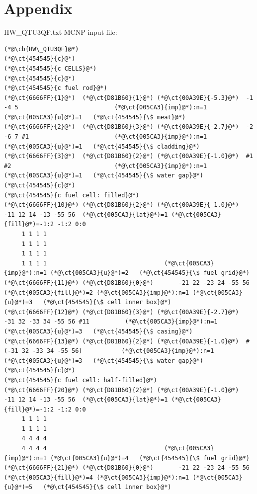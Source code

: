 \section*{Appendix}

HW\_QTU3QF.txt MCNP input file:

\begin{lstlisting}
(*@\cb{HW\_QTU3QF}@*)
(*@\ct{454545}{c}@*)
(*@\ct{454545}{c CELLS}@*)
(*@\ct{454545}{c}@*)
(*@\ct{454545}{c fuel rod}@*)
(*@\ct{6666FF}{1}@*)  (*@\ct{D81B60}{1}@*) (*@\ct{00A39E}{-5.3}@*)  -1 -4 5                           (*@\ct{005CA3}{imp}@*):n=1 (*@\ct{005CA3}{u}@*)=1   (*@\ct{454545}{\$ meat}@*)
(*@\ct{6666FF}{2}@*)  (*@\ct{D81B60}{3}@*) (*@\ct{00A39E}{-2.7}@*)  -2 -6 7 #1                        (*@\ct{005CA3}{imp}@*):n=1 (*@\ct{005CA3}{u}@*)=1   (*@\ct{454545}{\$ cladding}@*)
(*@\ct{6666FF}{3}@*)  (*@\ct{D81B60}{2}@*) (*@\ct{00A39E}{-1.0}@*)  #1 #2                             (*@\ct{005CA3}{imp}@*):n=1 (*@\ct{005CA3}{u}@*)=1   (*@\ct{454545}{\$ water gap}@*)
(*@\ct{454545}{c}@*)
(*@\ct{454545}{c fuel cell: filled}@*)
(*@\ct{6666FF}{10}@*) (*@\ct{D81B60}{2}@*) (*@\ct{00A39E}{-1.0}@*)  -11 12 14 -13 -55 56  (*@\ct{005CA3}{lat}@*)=1 (*@\ct{005CA3}{fill}@*)=-1:2 -1:2 0:0
     1 1 1 1
     1 1 1 1
     1 1 1 1
     1 1 1 1                                 (*@\ct{005CA3}{imp}@*):n=1 (*@\ct{005CA3}{u}@*)=2   (*@\ct{454545}{\$ fuel grid}@*)
(*@\ct{6666FF}{11}@*) (*@\ct{D81B60}{0}@*)       -21 22 -23 24 -55 56       (*@\ct{005CA3}{fill}@*)=2 (*@\ct{005CA3}{imp}@*):n=1 (*@\ct{005CA3}{u}@*)=3   (*@\ct{454545}{\$ cell inner box}@*)
(*@\ct{6666FF}{12}@*) (*@\ct{D81B60}{3}@*) (*@\ct{00A39E}{-2.7}@*)  -31 32 -33 34 -55 56 #11          (*@\ct{005CA3}{imp}@*):n=1 (*@\ct{005CA3}{u}@*)=3   (*@\ct{454545}{\$ casing}@*)
(*@\ct{6666FF}{13}@*) (*@\ct{D81B60}{2}@*) (*@\ct{00A39E}{-1.0}@*)  #(-31 32 -33 34 -55 56)           (*@\ct{005CA3}{imp}@*):n=1 (*@\ct{005CA3}{u}@*)=3   (*@\ct{454545}{\$ water gap}@*)
(*@\ct{454545}{c}@*)
(*@\ct{454545}{c fuel cell: half-filled}@*)
(*@\ct{6666FF}{20}@*) (*@\ct{D81B60}{2}@*) (*@\ct{00A39E}{-1.0}@*)  -11 12 14 -13 -55 56  (*@\ct{005CA3}{lat}@*)=1 (*@\ct{005CA3}{fill}@*)=-1:2 -1:2 0:0
     1 1 1 1
     1 1 1 1
     4 4 4 4
     4 4 4 4                                 (*@\ct{005CA3}{imp}@*):n=1 (*@\ct{005CA3}{u}@*)=4   (*@\ct{454545}{\$ fuel grid}@*)
(*@\ct{6666FF}{21}@*) (*@\ct{D81B60}{0}@*)       -21 22 -23 24 -55 56       (*@\ct{005CA3}{fill}@*)=4 (*@\ct{005CA3}{imp}@*):n=1 (*@\ct{005CA3}{u}@*)=5   (*@\ct{454545}{\$ cell inner box}@*)

\end{lstlisting}
